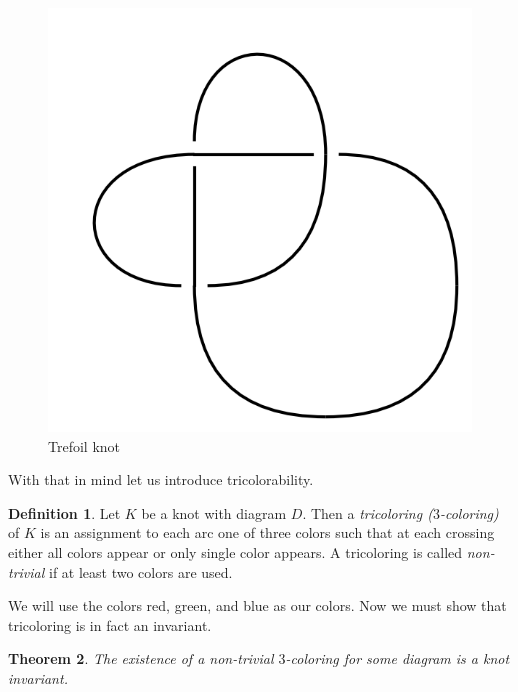 \documentclass[12pt]{amsart}
\newtheorem{theorem}{Theorem}[section]
\theoremstyle{definition}
\newtheorem{definition}[theorem]{Definition}
\theoremstyle{remark}
\numberwithin{equation}{section}
\newcommand{\ds}{.3}
\begin{document}
\begin{figure}
  \includegraphics[scale=\ds]{trefoil}
  \caption{Trefoil knot}
  \label{fig:trefoil}
\end{figure}

With that in mind let us introduce tricolorability.

\begin{definition}
  Let $K$ be a knot with diagram $D$. Then a \textit{tricoloring ($3$-coloring)}
  of $K$ is an assignment to each arc one of three colors
  such that at each crossing either all colors appear or
  only single color appears. A tricoloring is called \textit{non-trivial}
  if at least two colors are used.
\end{definition}

We will use the colors red, green, and blue as our colors.
Now we must show that tricoloring is in fact an invariant.

\begin{theorem}
  The existence of a non-trivial $3$-coloring for some diagram is a
  knot invariant.
\end{theorem}
\end{document}
